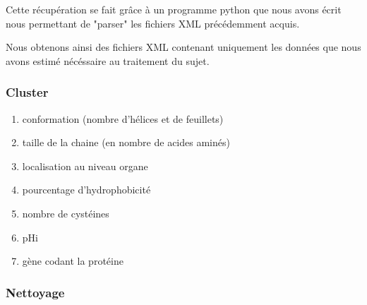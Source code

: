 Cette récupération se fait grâce à un programme python que nous avons écrit nous permettant de "parser" les fichiers XML précédemment acquis.

Nous obtenons ainsi des fichiers XML contenant uniquement les données que nous avons estimé nécéssaire au traitement du sujet.

\pagebreak
\subsubsection*{Cluster}

\begin{enumerate}
\item conformation (nombre d'hélices et de feuillets)
\item taille de la chaine (en nombre de acides aminés)
\item localisation au niveau organe
\item pourcentage d'hydrophobicité
\item nombre de cystéines
\item pHi
\item gène codant la protéine
\end{enumerate}

\subsubsection*{Nettoyage}
